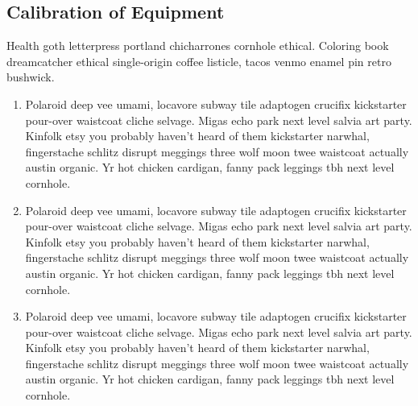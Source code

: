 \documentclass[letterpaper,titlepage,\myfontsize]{article}
\begin{document}
\subsection*{Calibration of Equipment} 

Health goth letterpress portland chicharrones cornhole ethical. Coloring book dreamcatcher ethical single-origin coffee listicle, tacos venmo enamel pin retro bushwick. 

\begin{enumerate}

    \item Polaroid deep vee umami, locavore subway tile adaptogen crucifix kickstarter pour-over waistcoat cliche selvage. Migas echo park next level salvia art party. Kinfolk etsy you probably haven't heard of them kickstarter narwhal, fingerstache schlitz disrupt meggings three wolf moon twee waistcoat actually austin organic. Yr hot chicken cardigan, fanny pack leggings tbh next level cornhole.

    \item Polaroid deep vee umami, locavore subway tile adaptogen crucifix kickstarter pour-over waistcoat cliche selvage. Migas echo park next level salvia art party. Kinfolk etsy you probably haven't heard of them kickstarter narwhal, fingerstache schlitz disrupt meggings three wolf moon twee waistcoat actually austin organic. Yr hot chicken cardigan, fanny pack leggings tbh next level cornhole.

    \item Polaroid deep vee umami, locavore subway tile adaptogen crucifix kickstarter pour-over waistcoat cliche selvage. Migas echo park next level salvia art party. Kinfolk etsy you probably haven't heard of them kickstarter narwhal, fingerstache schlitz disrupt meggings three wolf moon twee waistcoat actually austin organic. Yr hot chicken cardigan, fanny pack leggings tbh next level cornhole.

\end{enumerate}
\end{document}
